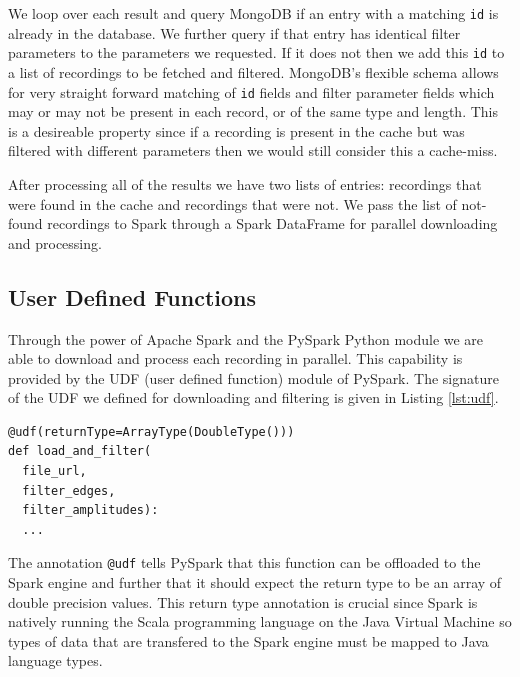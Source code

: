 \documentclass[conference,twoside]{IEEEtran}
\newcommand{\code}[1]{\texttt{#1}}
\begin{document}
We loop over each result and query MongoDB if an entry with a matching \code{id} is already in the database. We further query if that entry has identical filter parameters to the parameters we requested. If it does not then we add this \code{id} to a list of recordings to be fetched and filtered. MongoDB's flexible schema allows for very straight forward matching of \code{id} fields and filter parameter fields which may or may not be present in each record, or of the same type and length. This is a desireable property since if a recording is present in the cache but was filtered with different parameters then we would still consider this a cache-miss.

After processing all of the results we have two lists of entries: recordings that were found in the cache and recordings that were not. We pass the list of not-found recordings to Spark through a Spark DataFrame for parallel downloading and processing.

\subsection{User Defined Functions}
Through the power of Apache Spark and the PySpark Python module we are able to download and process each recording in parallel. This capability is provided by the UDF (user defined function) module of PySpark. The signature of the UDF we defined for downloading and filtering is given in Listing \ref{lst:udf}.
\begin{lstlisting}[language=Txt, caption={PySpark User Defined Functions}, label={lst:udf}]
@udf(returnType=ArrayType(DoubleType()))
def load_and_filter(
  file_url,
  filter_edges,
  filter_amplitudes):
  ...
\end{lstlisting}
The annotation \code{@udf} tells PySpark that this function can be offloaded to the Spark engine and further that it should expect the return type to be an array of double precision values. This return type annotation is crucial since Spark is natively running the Scala programming language on the Java Virtual Machine so types of data that are transfered to the Spark engine must be mapped to Java language types.
\end{document}
